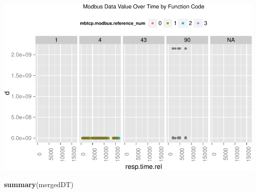 \documentclass[]{article}
\newenvironment{Shaded}{\begin{snugshade}}{\end{snugshade}}
\newcommand{\KeywordTok}[1]{\textcolor[rgb]{0.13,0.29,0.53}{\textbf{{#1}}}}
\newcommand{\NormalTok}[1]{{#1}}
\begin{document}
\includegraphics{edaReport_files/figure-latex/unnamed-chunk-37-1.pdf}

\pagebreak

\begin{Shaded}
\begin{Highlighting}[]
\KeywordTok{summary}\NormalTok{(mergedDT)}
\end{Highlighting}
\end{Shaded}
\end{document}
